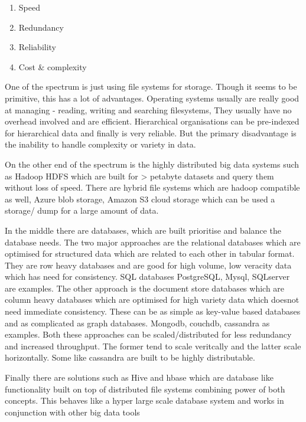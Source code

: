 \begin{enumerate}
    \item Speed
    \item Redundancy
    \item Reliability
    \item Cost \& complexity
\end{enumerate}

One of the spectrum is just using file systems for storage.
Though it seems to be primitive, this has a lot of advantages.
Operating systems usually are really good at managing - reading, writing and searching filesystems, They usually have no overhead involved and are efficient.
Hierarchical organisations can be pre-indexed for hierarchical data and finally is very reliable.
But the primary disadvantage is the inability to handle complexity or variety in data.

On the other end of the spectrum is the highly distributed big data systems such as Hadoop HDFS which are built for > petabyte datasets and query them without loss of speed.
There are hybrid file systems which are hadoop compatible as well, Azure blob storage, Amazon S3 cloud storage which can be used a storage/ dump for a large amount of data.

In the middle there are databases, which are built prioritise and balance the database needs.
The two major approaches are the relational databases which are optimised for structured data which are related to each other in tabular format.
They are row heavy databases and are good for high volume, low veracity data which has need for consistency.
SQL databases PostgreSQL, Mysql, SQLserver are examples.
The other approach is the document store databases which are column heavy databases which are optimised for high variety data which doesnot need immediate consistency.
These can be as simple as key-value based databases and as complicated as graph databases.
Mongodb, couchdb, cassandra as examples.
Both these approaches can be scaled/distributed for less redundancy and increased throughput.
The former tend to scale veritcally and the latter scale horizontally.
Some like cassandra are built to be highly distributable.

Finally there are solutions such as Hive and hbase which are database like functionality built on top of distributed file systems combining power of both concepts.
This behaves like a hyper large scale database system and works in conjunction with other big data tools


